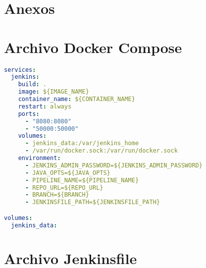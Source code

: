 
\appendix

\cleardoublepage 

\chapter*{Anexos}


\chapter{Archivo Docker Compose}
\label{anexo:dockercompose}

\begin{lstlisting}[language=yaml, caption={Contenido del archivo docker-compose.yml para levantar el entorno.}, label={lst:docker-compose}]
services:
  jenkins:
    build: .
    image: ${IMAGE_NAME}
    container_name: ${CONTAINER_NAME}
    restart: always
    ports:
      - "8080:8080"
      - "50000:50000"
    volumes:
      - jenkins_data:/var/jenkins_home
      - /var/run/docker.sock:/var/run/docker.sock
    environment:
      - JENKINS_ADMIN_PASSWORD=${JENKINS_ADMIN_PASSWORD}
      - JAVA_OPTS=${JAVA_OPTS}
      - PIPELINE_NAME=${PIPELINE_NAME}
      - REPO_URL=${REPO_URL}
      - BRANCH=${BRANCH}
      - JENKINSFILE_PATH=${JENKINSFILE_PATH}

volumes:
  jenkins_data:
\end{lstlisting}

\chapter{Archivo Jenkinsfile}
\label{anexo:jenkinsfile}

